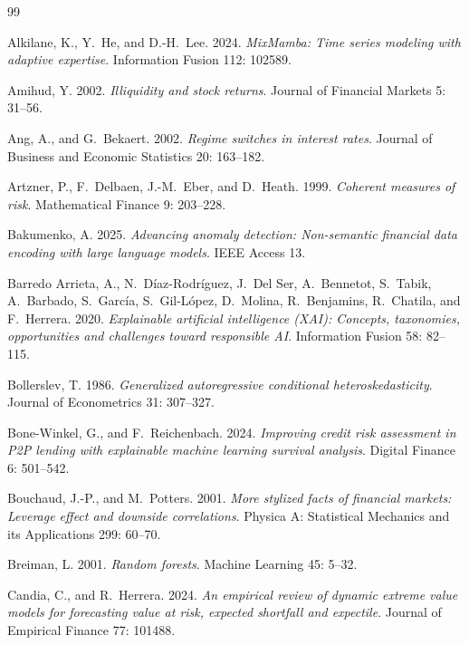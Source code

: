 \documentclass[]{interact}
\begin{document}
\begin{thebibliography}{99}

Alkilane, K., Y.~He, and D.-H.~Lee. 2024. \emph{MixMamba: Time series modeling with adaptive expertise}. Information Fusion 112: 102589.

Amihud, Y. 2002. \emph{Illiquidity and stock returns}. Journal of Financial Markets 5: 31--56.

Ang, A., and G.~Bekaert. 2002. \emph{Regime switches in interest rates}. Journal of Business and Economic Statistics 20: 163--182.

Artzner, P., F.~Delbaen, J.-M.~Eber, and D.~Heath. 1999. \emph{Coherent measures of risk}. Mathematical Finance 9: 203--228.

Bakumenko, A. 2025. \emph{Advancing anomaly detection: Non-semantic financial data encoding with large language models}. IEEE Access 13.

Barredo Arrieta, A., N.~Díaz-Rodríguez, J.~Del Ser, A.~Bennetot, S.~Tabik, A.~Barbado, S.~García, S.~Gil-López, D.~Molina, R.~Benjamins, R.~Chatila, and F.~Herrera. 2020. \emph{Explainable artificial intelligence (XAI): Concepts, taxonomies, opportunities and challenges toward responsible AI}. Information Fusion 58: 82--115.

Bollerslev, T. 1986. \emph{Generalized autoregressive conditional heteroskedasticity}. Journal of Econometrics 31: 307--327.

Bone-Winkel, G., and F.~Reichenbach. 2024. \emph{Improving credit risk assessment in P2P lending with explainable machine learning survival analysis}. Digital Finance 6: 501--542. 

Bouchaud, J.-P., and M.~Potters. 2001. \emph{More stylized facts of financial markets: Leverage effect and downside correlations}. Physica A: Statistical Mechanics and its Applications 299: 60--70.

Breiman, L. 2001. \emph{Random forests}. Machine Learning 45: 5--32.

Candia, C., and R.~Herrera. 2024. \emph{An empirical review of dynamic extreme value models for forecasting value at risk, expected shortfall and expectile}. Journal of Empirical Finance 77: 101488. 


\end{thebibliography}
\end{document}
